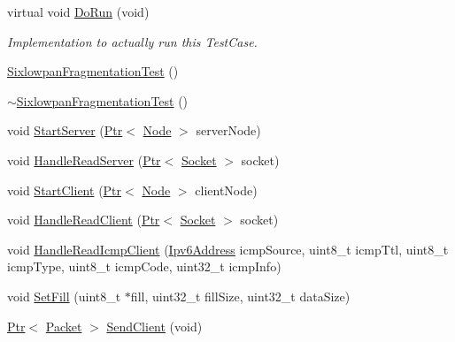 \begin{DoxyCompactItemize}
\item 
virtual void \hyperlink{classSixlowpanFragmentationTest_ae85beebff8e7d4f8c1e108beb17df274}{Do\+Run} (void)
\begin{DoxyCompactList}\small\item\em Implementation to actually run this Test\+Case. \end{DoxyCompactList}\item 
\hyperlink{classSixlowpanFragmentationTest_a9596a1aafaa4ef82bfcff50ea07d875e}{Sixlowpan\+Fragmentation\+Test} ()
\item 
\hyperlink{classSixlowpanFragmentationTest_adf5a60cb165d64f9d9f40065c897d192}{$\sim$\+Sixlowpan\+Fragmentation\+Test} ()
\item 
void \hyperlink{classSixlowpanFragmentationTest_a2b70baf58418b5e3c1daec1d77f06a84}{Start\+Server} (\hyperlink{classns3_1_1Ptr}{Ptr}$<$ \hyperlink{classns3_1_1Node}{Node} $>$ server\+Node)
\item 
void \hyperlink{classSixlowpanFragmentationTest_a8c6d98a798be3bd6eebfda06691a5e9e}{Handle\+Read\+Server} (\hyperlink{classns3_1_1Ptr}{Ptr}$<$ \hyperlink{classns3_1_1Socket}{Socket} $>$ socket)
\item 
void \hyperlink{classSixlowpanFragmentationTest_a24ee0242d6fa09b786a3280b20607445}{Start\+Client} (\hyperlink{classns3_1_1Ptr}{Ptr}$<$ \hyperlink{classns3_1_1Node}{Node} $>$ client\+Node)
\item 
void \hyperlink{classSixlowpanFragmentationTest_aaa094eb5910c6a8b462a6c6678258713}{Handle\+Read\+Client} (\hyperlink{classns3_1_1Ptr}{Ptr}$<$ \hyperlink{classns3_1_1Socket}{Socket} $>$ socket)
\item 
void \hyperlink{classSixlowpanFragmentationTest_a74e986c4c910d19a1d6b16866f712c06}{Handle\+Read\+Icmp\+Client} (\hyperlink{classns3_1_1Ipv6Address}{Ipv6\+Address} icmp\+Source, uint8\+\_\+t icmp\+Ttl, uint8\+\_\+t icmp\+Type, uint8\+\_\+t icmp\+Code, uint32\+\_\+t icmp\+Info)
\item 
void \hyperlink{classSixlowpanFragmentationTest_a6c1d0fec44562f79a8a9b78385d4d7d4}{Set\+Fill} (uint8\+\_\+t $\ast$fill, uint32\+\_\+t fill\+Size, uint32\+\_\+t data\+Size)
\item 
\hyperlink{classns3_1_1Ptr}{Ptr}$<$ \hyperlink{classns3_1_1Packet}{Packet} $>$ \hyperlink{classSixlowpanFragmentationTest_abf4cbe3df8958b6275ef164cb6a7aea5}{Send\+Client} (void)
\end{DoxyCompactItemize}
